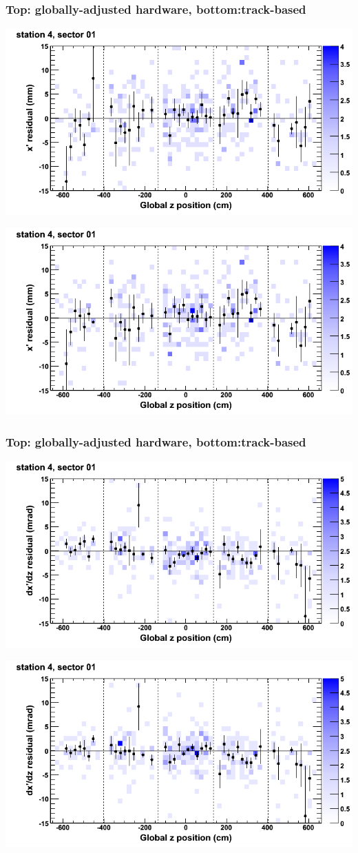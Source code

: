 \documentclass[compress]{beamer}
\begin{document}
\begin{frame}
\frametitle{Top: globally-adjusted hardware, bottom:track-based}
\includegraphics[width=0.7\linewidth]{NOV4_mapplots_HW/DTvsz_st4sec01_x.png}

\includegraphics[width=0.7\linewidth]{NOV4_mapplots/DTvsz_st4sec01_x.png}
\end{frame}

\begin{frame}
\frametitle{Top: globally-adjusted hardware, bottom:track-based}
\includegraphics[width=0.7\linewidth]{NOV4_mapplots_HW/DTvsz_st4sec01_dxdz.png}

\includegraphics[width=0.7\linewidth]{NOV4_mapplots/DTvsz_st4sec01_dxdz.png}
\end{frame}
\end{document}
